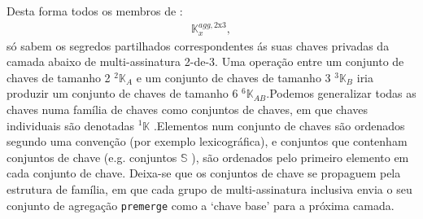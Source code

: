 
Desta forma todos os membros de :
\begin{align*}
\mathbb{K}^{agg,\textrm{2x3}}_x ,
\end{align*}
só sabem os segredos partilhados correspondentes ás suas chaves privadas da camada abaixo de multi-assinatura 2-de-3. Uma operação entre um conjunto de chaves de tamanho 2 ${}^{2}\mathbb{K}_A$ e um conjunto de chaves de tamanho 3 ${}^{3}\mathbb{K}_B$ iria produzir um conjunto de chaves de tamanho 6 ${}^{6}\mathbb{K}_{AB}$.\newline Podemos generalizar todas as chaves numa família de chaves como conjuntos de chaves, em que chaves individuais são denotadas ${}^{1}\mathbb{K}$ .\newline Elementos num conjunto de chaves são ordenados segundo uma convenção (por exemplo lexicográfica), e conjuntos que contenham conjuntos de chave (e.g. conjuntos $\mathbb{S}$ ), são ordenados pelo primeiro elemento em cada conjunto de chave.   
Deixa-se que os conjuntos de chave se propaguem pela estrutura de família, em que cada grupo de multi-assinatura inclusiva envia o seu conjunto de agregação {\tt premerge} como a `chave base' para a próxima camada.
